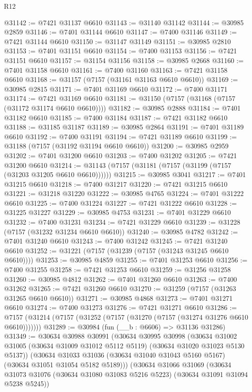 \begin{lexlean}{R12}
\begin{coremodule}
@31142 := @7421 @31137 @6610
@31143 := @31140 @31142
@31144 := @30985 @2859
@31146 := @7401 @31144 @6610
@31147 := @7400 @31146
@31149 := @7421 @31144 @6610
@31150 := @31147 @31149
@31151 := @30985 @2810
@31153 := @7401 @31151 @6610
@31154 := @7400 @31153
@31156 := @7421 @31151 @6610
@31157 := @31154 @31156
@31158 := @30985 @2668
@31160 := @7401 @31158 @6610
@31161 := @7400 @31160
@31163 := @7421 @31158 @6610
@31168 := @31157 (@7157 (@31161 @31163 @6610 @6610))
@31169 := @30985 @2815
@31171 := @7401 @31169 @6610
@31172 := @7400 @31171
@31174 := @7421 @31169 @6610
@31181 := @31150 (@7157 (@31168 (@7157 (@31172 @31174 @6610 @6610))))
@31182 := @30985 @2888
@31184 := @7401 @31182 @6610
@31185 := @7400 @31184
@31187 := @7421 @31182 @6610
@31188 := @31185 @31187
@31189 := @30985 @2864
@31191 := @7401 @31189 @6610
@31192 := @7400 @31191
@31194 := @7421 @31189 @6610
@31199 := @31188 (@7157 (@31192 @31194 @6610 @6610))
@31200 := @30985 @2959
@31202 := @7401 @31200 @6610
@31203 := @7400 @31202
@31205 := @7421 @31200 @6610
@31214 := @31143 (@7157 (@31181 (@7157 (@31199 (@7157 (@31203 @31205 @6610 @6610))))))
@31215 := @30985 @3041
@31217 := @7401 @31215 @6610
@31218 := @7400 @31217
@31220 := @7421 @31215 @6610
@31221 := @31218 @31220
@31222 := @30985 @4765
@31224 := @7401 @31222 @6610
@31225 := @7400 @31224
@31227 := @7421 @31222 @6610
@31228 := @31225 @31227
@31229 := @30985 @4753
@31231 := @7401 @31229 @6610
@31232 := @7400 @31231
@31234 := @7421 @31229 @6610
@31239 := @31228 (@7157 (@31232 @31234 @6610 @6610))
@31240 := @30985 @4782
@31242 := @7401 @31240 @6610
@31243 := @7400 @31242
@31245 := @7421 @31240 @6610
@31252 := @31221 (@7157 (@31239 (@7157 (@31243 @31245 @6610 @6610))))
@31253 := @30985 @4859
@31255 := @7401 @31253 @6610
@31256 := @7400 @31255
@31258 := @7421 @31253 @6610
@31259 := @31256 @31258
@31260 := @30985 @4812
@31262 := @7401 @31260 @6610
@31263 := @7400 @31262
@31265 := @7421 @31260 @6610
@31270 := @31259 (@7157 (@31263 @31265 @6610 @6610))
@31271 := @30985 @4868
@31273 := @7401 @31271 @6610
@31274 := @7400 @31273
@31276 := @7421 @31271 @6610
@31286 := @7157 (@31214 (@7157 (@31252 (@7157 (@31270 (@7157 (@31274 @31276 @6610 @6610)))))))
@31289 := @30984 (fun (__b : @6606) => @31136 @31286)
@31349 := @30634
    @30988
    @30991
    (@30634
      @30995
      @30998
      (@30634 @31002 @31005 (@30634 @31009 @31012 @5112 @5119) (@30634 @31020 @31023 @5130 @5137))
      (@30634 @31033 @31036 (@30634 @31040 @31043 @5160 @5167) (@30634 @31051 @31054 @5182 @5189)))
    (@30634
      @31066
      @31069
      (@30634 @31073 @31076 (@30634 @31080 @31083 @5216 @5223) (@30634 @31091 @31094 @5238 @5245))

\end{coremodule}
\end{lexlean}
